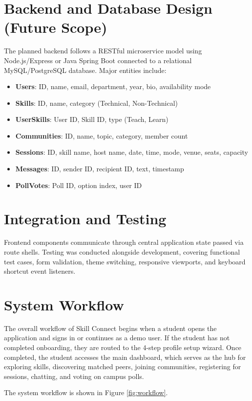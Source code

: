 \documentclass[12pt,a4paper]{report}
\begin{document}
\section{Backend and Database Design (Future Scope)}
The planned backend follows a RESTful microservice model using Node.js/Express or Java Spring Boot connected to a relational MySQL/PostgreSQL database.
Major entities include:
\begin{itemize}
    \item \textbf{Users}: ID, name, email, department, year, bio, availability mode
    \item \textbf{Skills}: ID, name, category (Technical, Non-Technical)
    \item \textbf{UserSkills}: User ID, Skill ID, type (Teach, Learn)
    \item \textbf{Communities}: ID, name, topic, category, member count
    \item \textbf{Sessions}: ID, skill name, host name, date, time, mode, venue, seats, capacity
    \item \textbf{Messages}: ID, sender ID, recipient ID, text, timestamp
    \item \textbf{PollVotes}: Poll ID, option index, user ID
\end{itemize}

\section{Integration and Testing}
Frontend components communicate through central application state passed via route shells. Testing was conducted alongside development, covering functional test cases, form validation, theme switching, responsive viewports, and keyboard shortcut event listeners.

\newpage
\section{System Workflow}
The overall workflow of Skill Connect begins when a student opens the application and signs in or continues as a demo user. If the student has not completed onboarding, they are routed to the 4-step profile setup wizard. Once completed, the student accesses the main dashboard, which serves as the hub for exploring skills, discovering matched peers, joining communities, registering for sessions, chatting, and voting on campus polls.

The system workflow is shown in Figure \ref{fig:workflow}.
\end{document}
